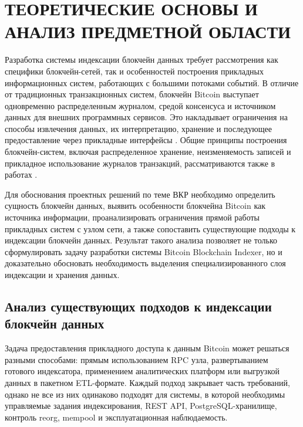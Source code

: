﻿%
\section{ТЕОРЕТИЧЕСКИЕ ОСНОВЫ И АНАЛИЗ ПРЕДМЕТНОЙ ОБЛАСТИ}

Разработка системы индексации блокчейн данных требует рассмотрения как
специфики блокчейн-сетей, так и особенностей построения прикладных
информационных систем, работающих с большими потоками событий. В отличие от
традиционных транзакционных систем, блокчейн Bitcoin выступает одновременно
распределенным журналом, средой консенсуса и источником данных для внешних
программных сервисов. Это накладывает ограничения на способы извлечения
данных, их интерпретацию, хранение и последующее предоставление через
прикладные интерфейсы \cite{narayanan2016bitcoin, antonopoulos2017mastering}.
Общие принципы построения блокчейн-систем, включая распределенное хранение,
неизменяемость записей и прикладное использование журналов транзакций,
рассматриваются также в работах \cite{swan2015blockchain, drescher2017blockchain}.

Для обоснования проектных решений по теме ВКР необходимо определить сущность
блокчейн данных, выявить особенности блокчейна Bitcoin как источника
информации, проанализировать ограничения прямой работы прикладных систем с
узлом сети, а также сопоставить существующие подходы к индексации
блокчейн данных. Результат такого анализа позволяет не только сформулировать
задачу разработки системы Bitcoin Blockchain Indexer, но и
доказательно обосновать необходимость выделения специализированного слоя
индексации и хранения данных.

\subsection{Анализ существующих подходов к индексации блокчейн данных}

Задача предоставления прикладного доступа к данным Bitcoin может решаться
разными способами: прямым использованием RPC узла, развертыванием готового
индексатора, применением аналитических платформ или выгрузкой данных в
пакетном ETL-формате. Каждый подход закрывает часть требований, однако не все
из них одинаково подходят для системы, в которой необходимы управляемые
задания индексирования, REST API, PostgreSQL-хранилище, контроль reorg,
mempool и эксплуатационная наблюдаемость.

